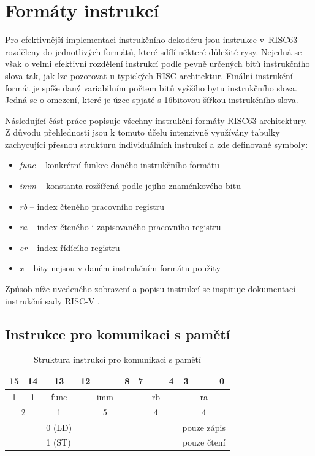 \documentclass[
  digital, %
  color,   %
  table,   %
  twoside, %
  nolof,   %
  nolot,   %
]{fithesis3}
\begin{document}
\section{Formáty instrukcí}
Pro efektivnější implementaci instrukčního dekodéru jsou instrukce v~RISC63 rozděleny do jednotlivých formátů, které sdílí některé důležité rysy. Nejedná se však o velmi efektivní rozdělení instrukcí podle pevně určených bitů instrukčního slova tak, jak lze pozorovat u typických RISC architektur. Finální instrukční formát je spíše daný variabilním počtem bitů vyššího bytu instrukčního slova. Jedná se o omezení, které je úzce spjaté s 16bitovou šířkou instrukčního slova. \newpage

Následující část práce popisuje všechny instrukční formáty RISC63 architektury. Z důvodu přehlednosti jsou k tomuto účelu intenzivně využívány tabulky zachycující přesnou strukturu individuálních instrukcí a zde definované symboly:

\begin{itemize}
  \item \textit{func} -- konkrétní funkce daného instrukčního formátu
  \item \textit{imm} -- konstanta rozšířená podle jejího znaménkového bitu
  \item \textit{rb} -- index čteného pracovního registru
  \item \textit{ra} -- index čteného i zapisovaného pracovního registru
  \item \textit{cr} -- index řídícího registru
  \item \textit{x} -- bity nejsou v daném instrukčním formátu použity
\end{itemize}

Způsob níže uvedeného zobrazení a popisu instrukcí se inspiruje dokumentací instrukční sady RISC-V \parencite{waterman19}.

\subsection{Instrukce pro komunikaci s pamětí}
\begin{table}[H]
\caption{Struktura instrukcí pro komunikaci s pamětí}
\begin{tabular}{cccccccccccccccc}
15 & 14 & 13 & 12 &  &  &  & 8 & 7 &  &  & 4 & 3 &  &  & 0 \\ \hline
\multicolumn{1}{|c}{1} & \multicolumn{1}{c|}{1} & \multicolumn{1}{c|}{func} & \multicolumn{5}{c|}{imm} & \multicolumn{4}{c|}{rb} & \multicolumn{4}{c|}{ra} \\ \hline
\multicolumn{2}{c}{{\color[HTML]{656565} 2}} & {\color[HTML]{656565} 1} & \multicolumn{5}{c}{{\color[HTML]{656565} 5}} & \multicolumn{4}{c}{{\color[HTML]{656565} 4}} & \multicolumn{4}{c}{{\color[HTML]{656565} 4}} \\
 &  & \multicolumn{1}{l}{0 (LD)} &  &  &  &  &  &  &  &  &  & \multicolumn{4}{c}{pouze zápis} \\
 &  & \multicolumn{1}{l}{1 (ST)} &  &  &  &  &  &  &  &  &  & \multicolumn{4}{c}{pouze čtení}
\end{tabular}
\end{table}
\end{document}
